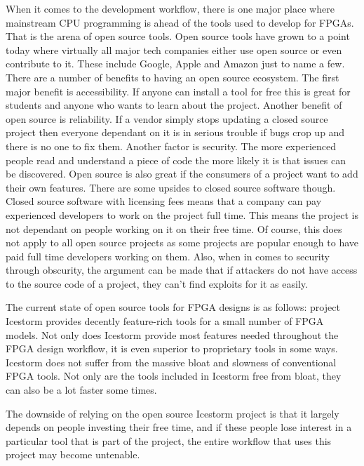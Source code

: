 \documentclass{article}
\begin{document}
    When it comes to the development workflow, there is one major place where mainstream CPU programming
    is ahead of the tools used to develop for FPGAs. That is the arena of open source tools.
    Open source tools have grown to a point today where virtually all major tech companies
    either use open source or even contribute to it. These include Google, Apple and Amazon
    just to name a few.
    There are a number of benefits to having an open source ecosystem. The first major
    benefit is accessibility. If anyone can install a tool for free this is great
    for students and anyone who wants to learn about the project.
    Another benefit of open source is reliability. If a vendor simply stops updating a closed
    source project then everyone dependant on it is in serious trouble if bugs
    crop up and there is no one to fix them.
    Another factor is security. The more experienced people read and understand a piece of
    code the more likely it is that issues can be discovered.
    Open source is also great if the consumers of a project want to add their own features.
    There are some upsides to closed source software though. Closed source software with
    licensing fees means that a company can pay experienced developers to work on the project full
    time. This means the project is not dependant on people working on it on their free time.
    Of course, this does not apply to all open source projects as some projects are popular
    enough to have paid full time developers working on them.
    Also, when in comes to security through obscurity, the argument can be made that
    if attackers do not have access to the source code of a project, they can't find
    exploits for it as easily.

    The current state of open source tools for FPGA designs is as follows:
    project Icestorm provides decently feature-rich tools for a small number of FPGA
    models. Not only does Icestorm provide most features needed throughout the FPGA
    design workflow, it is even superior to proprietary tools in some ways. Icestorm
    does not suffer from the massive bloat and slowness of conventional FPGA tools.
    Not only are the tools included in Icestorm free from bloat, they can also be
    a lot faster some times.

    The downside of relying on the open source Icestorm project is that it largely depends
    on people investing their free time, and if these people lose interest in a particular
    tool that is part of the project, the entire workflow that uses this project
    may become untenable.
        
\end{document}

